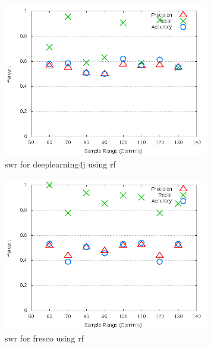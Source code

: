\begin{figure}[!t]
\centering
\includegraphics[width=0.8\textwidth]{images/rf/test_1/deeplearning4j_sample_range.png}
\caption{\gls{swr} for deeplearning4j using \gls{rf}}
\label{fig:test_1_deeplearning4j_rf}
\end{figure}

\begin{figure}[!t]
\centering
\includegraphics[width=0.8\textwidth]{images/rf/test_1/fresco_sample_range.png}
\caption{\gls{swr} for fresco using \gls{rf}}
\label{fig:test_1_fresco_rf}
\end{figure}

